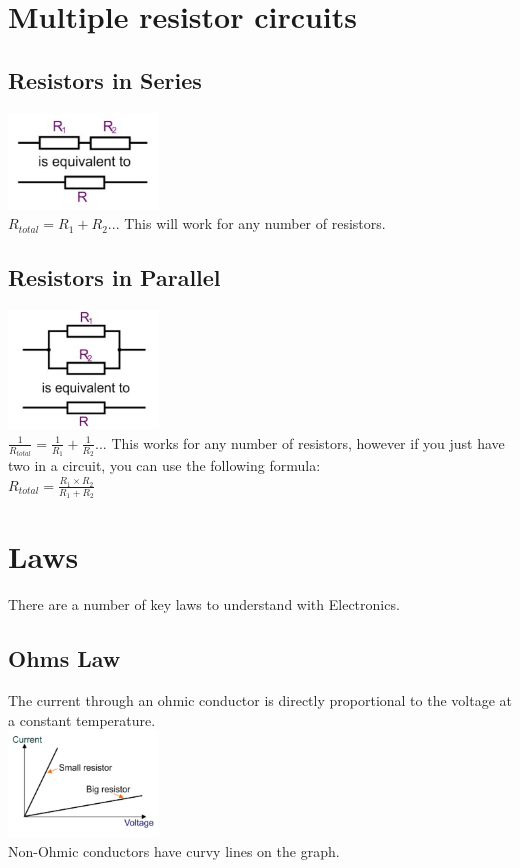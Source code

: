 \documentclass[a4paper,11pt, twocolumn]{article}
\begin{document}
\section{Multiple resistor circuits}
\subsection{Resistors in Series}
\includegraphics[width=0.3\textwidth]{resistorSeries.jpg}\\
$R_{total} = R_1 + R_2...$ This will work for any number of resistors.
\subsection{Resistors in Parallel}
\includegraphics[width=0.3\textwidth]{resistorParallel.jpg}\\
$\displaystyle \frac{1}{R_{total}} = \frac{1}{R_1} + \frac{1}{R_2}...$ This works for any number of resistors, however if you just have two in a circuit, you can use the following formula:\\
$\displaystyle R_{total} = \frac{R_1 \times R_2}{R_1 + R_2}$

\section{Laws}
There are a number of key laws to understand with Electronics.
\subsection{Ohms Law}
The current through an ohmic conductor is directly proportional to the voltage at a constant temperature.\\
\includegraphics[width=0.3\textwidth]{ohmsLaw.jpg}\\
Non-Ohmic conductors have curvy lines on the graph.
\end{document}
